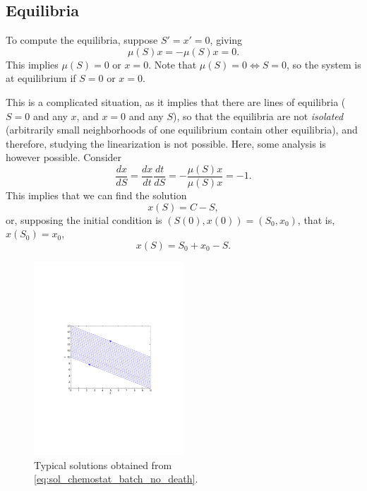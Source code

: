 \subsection{Equilibria}
To compute the equilibria, suppose $S'=x'=0$, giving
\[
\mu(S)x=-\mu(S)x=0.
\]
This implies $\mu(S)=0$ or $x=0$. Note that $\mu(S)=0\Leftrightarrow S=0$, so the system is at equilibrium if $S=0$ or $x=0$.

This is a complicated situation, as it implies that there are lines of
equilibria ($S=0$ and any $x$, and $x=0$ and any $S$), so that the equilibria
are not \emph{isolated} (arbitrarily small neighborhoods of one equilibrium
contain other equilibria), and therefore, studying the linearization is not
possible.
Here, some analysis is however possible.
Consider
\[
\frac{dx}{dS}=\frac{dx}{dt}\frac{dt}{dS}=-\frac{\mu(S)x}{\mu(S)x}=-1.
\]
This implies that we can find the solution
\[
x(S)=C-S,
\]
or, supposing the initial condition is $(S(0),x(0))=(S_0,x_0)$, that is, $x(S_0)=x_0$,
\begin{equation}\label{eq:sol_chemostat_batch_no_death}
x(S)=S_0+x_0-S.
\end{equation}
\begin{figure}[htbp]
\begin{center}
\includegraphics[width=0.5\textwidth]
{../figs_05_chemostat/chemo_batch_nodeath_Sx}
\caption{Typical solutions obtained from
\eqref{eq:sol_chemostat_batch_no_death}.}
\end{center}
\end{figure}




